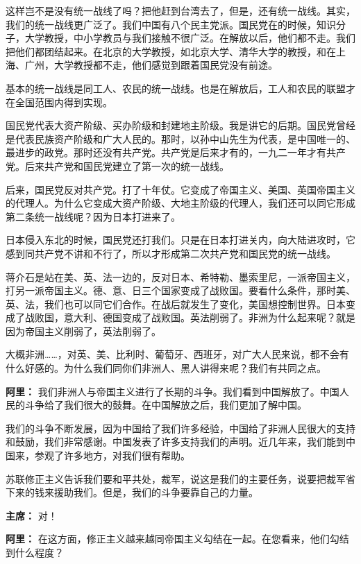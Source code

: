 \begin{duihua}
这样岂不是没有统一战线了吗？把他赶到台湾去了，但是，还有统一战线。其实，我们的统一战线更广泛了。我们中国有八个民主党派。国民党在的时候，知识分子，大学教授，中小学教员与我们接触不很广泛。在解放以后，他们都不走。我们把他们都团结起来。在北京的大学教授，如北京大学、清华大学的教授，和在上海、广州，大学教授都不走，他们感觉到跟着国民党没有前途。

基本的统一战线是同工人、农民的统一战线。也是在解放后，工人和农民的联盟才在全国范围内得到实现。

国民党代表大资产阶级、买办阶级和封建地主阶级。我是讲它的后期。国民党曾经是代表民族资产阶级和广大人民的。那时，以孙中山先生为代表，是中国唯一的、最进步的政党。那时还没有共产党。共产党是后来才有的，一九二一年才有共产党。后来共产党和国民党建立了第一次的统一战线。

后来，国民党反对共产党。打了十年仗。它变成了帝国主义、美国、英国帝国主义的代理人。为什么它变成大资产阶级、大地主阶级的代理人，我们还可以同它形成第二条统一战线呢？因为日本打进来了。

日本侵入东北的时候，国民党还打我们。只是在日本打进关内，向大陆进攻时，它感到同共产党不讲和不行了，所以才形成第二次共产党和国民党的统一战线。

蒋介石是站在美、英、法一边的，反对日本、希特勒、墨索里尼，一派帝国主义，打另一派帝国主义。德、意、日三个国家变成了战败国。要看什么条件，那时美、英、法，我们也可以同它们合作。在战后就发生了变化，美国想控制世界。日本变成了战败国，意大利、德国变成了战败国。英法削弱了。非洲为什么起来呢？就是因为帝国主义削弱了，英法削弱了。

大概非洲……，对英、美、比利时、葡萄牙、西班牙，对广大人民来说，都不会有什么好感的。为什么我们同你们非洲人、黑人讲得来呢？我们有共同之点。

\item[\textbf{阿里：}] 我们非洲人与帝国主义进行了长期的斗争。我们看到中国解放了。中国人民的斗争给了我们很大的鼓舞。在中国解放之后，我们更加了解中国。

我们的斗争不断发展，因为中国给了我们许多经验，中国给了非洲人民很大的支持和鼓励，我们非常感谢。中国发表了许多支持我们的声明。近几年来，我们能到中国来，参观了许多地方，对我们很有帮助。

苏联修正主义告诉我们要和平共处，裁军，说这是我们的主要任务，说要把裁军省下来的钱来援助我们。但是，我们的斗争要靠自己的力量。

\item[\textbf{主席：}] 对！

\item[\textbf{阿里：}] 在这方面，修正主义越来越同帝国主义勾结在一起。在您看来，他们勾结到什么程度？


\end{duihua}
